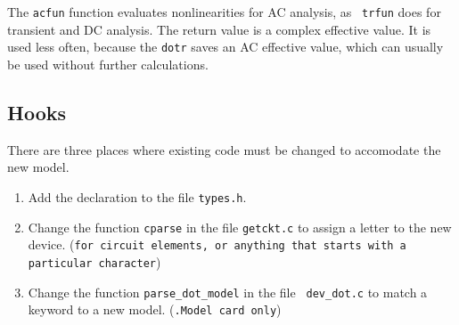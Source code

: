 The {\tt acfun} function evaluates nonlinearities for AC analysis, as {\tt
trfun} does for transient and DC analysis.  The return value is a complex
effective value.  It is used less often, because the {\tt dotr} saves an AC
effective value, which can usually be used without further calculations.
\subsection{Hooks}

There are three places where existing code must be changed to accomodate the
new model.

\begin{enumerate}

\item Add the declaration to the file {\tt types.h}.

\item Change the function {\tt cparse} in the file {\tt getckt.c} to assign
a letter to the new device.  ({\tt for circuit elements, or anything that
starts with a particular character})

\item Change the function {\tt parse\_dot\_model} in the file {\tt
dev\_dot.c} to match a keyword to a new model.  ({\tt .Model card only})

\end{enumerate}
